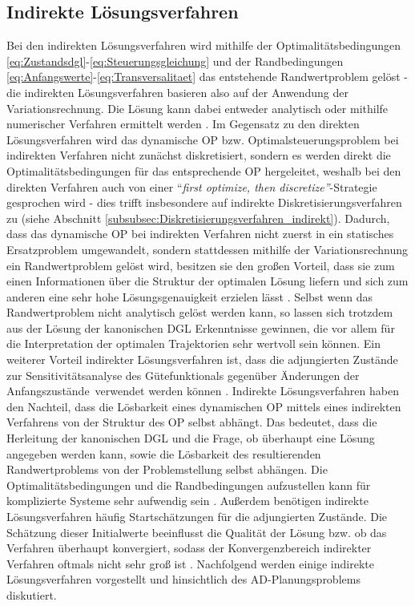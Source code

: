 \subsection{Indirekte Lösungsverfahren}\label{subsec:Indirekt}
Bei den indirekten Lösungsverfahren wird mithilfe der Optimalitätsbedingungen \eqref{eq:Zustandsdgl}-\eqref{eq:Steuerungsgleichung} und der Randbedingungen \eqref{eq:Anfangswerte}-\eqref{eq:Transversalitaet} das entstehende Randwertproblem gelöst \cite{Papageorgiou.2012} - die indirekten Lösungsverfahren basieren also auf der Anwendung der Variationsrechnung. Die Lösung kann dabei entweder analytisch oder mithilfe numerischer Verfahren ermittelt werden \cite{Gerdts.2010}. Im Gegensatz zu den direkten Lösungsverfahren wird das dynamische \gls{OP} bzw. Optimalsteuerungsproblem bei indirekten Verfahren nicht zunächst diskretisiert, sondern es werden direkt die Optimalitätsbedingungen für das entsprechende \gls{OP} hergeleitet, weshalb bei den direkten Verfahren auch von einer ``\textit{first optimize, then discretize''}-Strategie gesprochen wird \cite{Papageorgiou.2012} - dies trifft insbesondere auf indirekte Diskretisierungsverfahren zu (siehe Abschnitt \ref{subsubsec:Diskretisierungsverfahren_indirekt}). Dadurch, dass das dynamische \gls{OP} bei indirekten Verfahren nicht zuerst in ein statisches Ersatzproblem umgewandelt, sondern stattdessen mithilfe der Variationsrechnung ein Randwertproblem gelöst wird, besitzen sie den großen Vorteil, dass sie zum einen Informationen über die Struktur der optimalen Lösung liefern und sich zum anderen eine sehr hohe Lösungsgenauigkeit erzielen lässt \cite{KnutGraichen.2012}. Selbst wenn das Randwertproblem nicht analytisch gelöst werden kann, so lassen sich trotzdem aus der Lösung der kanonischen \gls{DGL} Erkenntnisse gewinnen, die vor allem für die Interpretation der optimalen Trajektorien sehr wertvoll sein können. Ein weiterer Vorteil indirekter Lösungsverfahren ist, dass die adjungierten Zustände zur Sensitivitätsanalyse des Gütefunktionals gegenüber Änderungen der Anfangszustände \xzero\,verwendet werden können \cite{KnutGraichen.2012}. Indirekte Lösungsverfahren haben den Nachteil, dass die Lösbarkeit eines dynamischen \gls{OP} mittels eines indirekten Verfahrens von der Struktur des \gls{OP} selbst abhängt. Das bedeutet, dass die Herleitung der kanonischen \gls{DGL} und die Frage, ob überhaupt eine Lösung angegeben werden kann, sowie die Lösbarkeit des resultierenden Randwertproblems von der Problemstellung selbst abhängen. Die Optimalitätsbedingungen und die Randbedingungen aufzustellen kann für komplizierte Systeme sehr aufwendig sein \cite{Papageorgiou.2012}. Außerdem benötigen indirekte Lösungsverfahren häufig Startschätzungen für die adjungierten Zustände. Die Schätzung dieser Initialwerte beeinflusst die Qualität der Lösung bzw. ob das Verfahren überhaupt konvergiert, sodass der Konvergenzbereich indirekter Verfahren oftmals nicht sehr groß ist \cite{Papageorgiou.2012}. Nachfolgend werden einige indirekte Lösungsverfahren vorgestellt und hinsichtlich des \gls{AD}-Planungsproblems diskutiert. 
